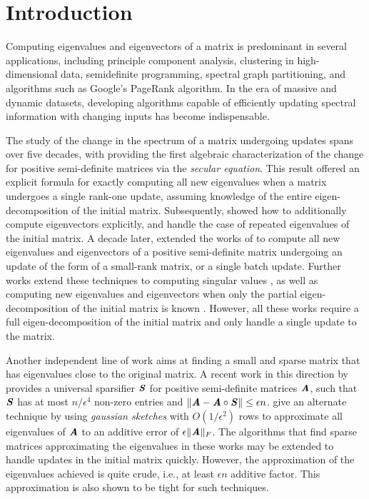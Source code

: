 


\section{Introduction}

Computing eigenvalues and eigenvectors of a matrix is predominant in several applications, including principle component analysis, clustering in high-dimensional data, semidefinite programming, spectral graph partitioning, and algorithms such as Google's PageRank algorithm. In the era of massive and dynamic datasets, developing algorithms capable of efficiently updating spectral information with changing inputs has become indispensable.

The study of the change in the spectrum of a matrix undergoing updates spans over five decades, with \textcite{golub1973some} providing the first algebraic characterization of the change for positive semi-definite matrices via the {\it secular equation}. This result offered an explicit formula for exactly computing all new eigenvalues when a matrix undergoes a single rank-one update, assuming knowledge of the entire eigen-decomposition of the initial matrix. Subsequently, \textcite{bunch1978rank} showed how to additionally compute eigenvectors explicitly, and handle the case of repeated eigenvalues of the initial matrix. A decade later, \textcite{arbenz1988restricted} extended the works of \cite{golub1973some,bunch1978rank} to compute all new eigenvalues and eigenvectors of a positive semi-definite matrix undergoing an update of the form of a small-rank matrix, or a single batch update. Further works extend these techniques to computing singular values \cite{stange2008efficient}, as well as computing new eigenvalues and eigenvectors when only the partial eigen-decomposition of the initial matrix is known \cite{mitz2019symmetric}. However, all these works require a full eigen-decomposition of the initial matrix and only handle a single update to the matrix. 

Another independent line of work aims at finding a small and sparse matrix that has eigenvalues close to the original matrix. 
A recent work in this direction by \textcite{bhattacharjee2023universal} provides a universal sparsifier $\SS$ for positive semi-definite matrices $\AA$, such that $\SS$ has at most $n/\epsilon^4$ non-zero entries and $\|\AA-\AA\circ\SS\|\leq \epsilon n$. \textcite{swartworth2023optimal} give an alternate technique by using {\it gaussian sketches} with $O(1/\epsilon^2)$ rows to approximate all eigenvalues of $\AA$ to an additive error of $\epsilon\|\AA\|_F$. The algorithms that find sparse matrices approximating the eigenvalues in these works may be extended to handle updates in the initial matrix quickly. However, the approximation of the eigenvalues achieved is quite crude, i.e., at least $\epsilon n$ additive factor. This approximation is also shown to be tight for such techniques.



